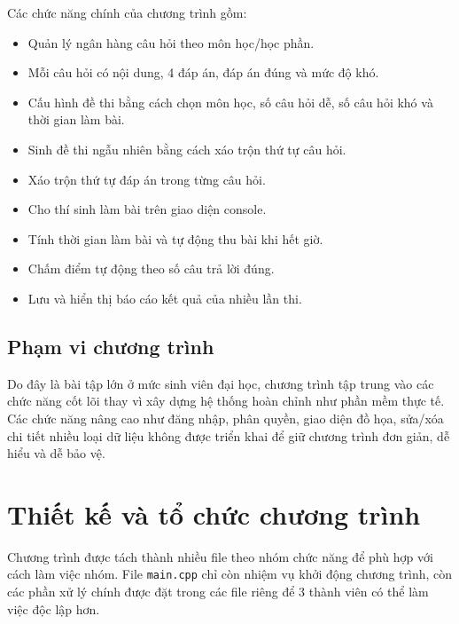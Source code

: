 \documentclass[12pt,a4paper]{article}
\begin{document}
Các chức năng chính của chương trình gồm:

\begin{itemize}
    \item Quản lý ngân hàng câu hỏi theo môn học/học phần.
    \item Mỗi câu hỏi có nội dung, 4 đáp án, đáp án đúng và mức độ khó.
    \item Cấu hình đề thi bằng cách chọn môn học, số câu hỏi dễ, số câu hỏi khó và thời gian làm bài.
    \item Sinh đề thi ngẫu nhiên bằng cách xáo trộn thứ tự câu hỏi.
    \item Xáo trộn thứ tự đáp án trong từng câu hỏi.
    \item Cho thí sinh làm bài trên giao diện console.
    \item Tính thời gian làm bài và tự động thu bài khi hết giờ.
    \item Chấm điểm tự động theo số câu trả lời đúng.
    \item Lưu và hiển thị báo cáo kết quả của nhiều lần thi.
\end{itemize}

\subsection{Phạm vi chương trình}

Do đây là bài tập lớn ở mức sinh viên đại học, chương trình tập trung vào các chức năng cốt lõi thay vì xây dựng hệ thống hoàn chỉnh như phần mềm thực tế. Các chức năng nâng cao như đăng nhập, phân quyền, giao diện đồ họa, sửa/xóa chi tiết nhiều loại dữ liệu không được triển khai để giữ chương trình đơn giản, dễ hiểu và dễ bảo vệ.


\section{Thiết kế và tổ chức chương trình}

Chương trình được tách thành nhiều file theo nhóm chức năng để phù hợp với cách làm việc nhóm. File \texttt{main.cpp} chỉ còn nhiệm vụ khởi động chương trình, còn các phần xử lý chính được đặt trong các file riêng để 3 thành viên có thể làm việc độc lập hơn.
\end{document}
